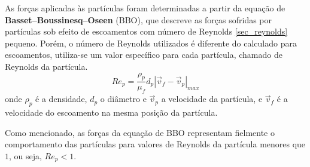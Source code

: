 As forças aplicadas às partículas foram determinadas a partir da equação de \textbf{Basset–Boussinesq–Oseen} (BBO), que descreve as forças sofridas por partículas sob efeito de escoamentos com número de Reynolds \ref{sec_reynolds} pequeno.
Porém, o número de Reynolds utilizados é diferente do calculado para escoamentos, utiliza-se um valor específico para cada partícula, chamado de Reynolds da partícula.
\begin{equation}
    Re_{p} = \dfrac{\rho_p}{\mu_f} d_{p} \left|\vec{v}_{f} - \vec{v}_{p} \right|_{max}
    \label{reynolds_p}
\end{equation}
onde $\rho_p$ é a densidade, $d_p$ o diâmetro e $\vec{v}_{p}$ a velocidade da partícula, e $\vec{v}_{f}$ é a velocidade do escoamento na mesma posição da partícula.

Como mencionado, as forças da equação de BBO representam fielmente o comportamento das partículas para valores de Reynolds da partícula menores que $1$,  ou seja, $Re_{p} < 1$.

